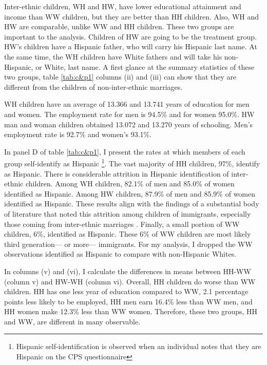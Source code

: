 \documentclass[12pt, fullpage]{article}
\begin{document}
Inter-ethnic children, WH and HW, have lower educational attainment and income than WW children, but they are better than HH children. Also, WH and HW are comparable, unlike WW and HH children. These two groups are important to the analysis. Children of HW are going to be the treatment group. HW's children have a Hispanic father, who will carry his Hispanic last name. At the same time, the WH children have White fathers and will take his non-Hispanic, or White, last name. A first glance at the summary statistics of these two groups, table \ref{tab:c&p1} columns (ii) and (iii) can show that they are different from the children of non-inter-ethnic marriages. 



\newpage




WH children have an average of 13.366 and 13.741 years of education for men and women. The employment rate for men is 94.5\% and for women 95.0\%. HW man and woman children obtained 13.072 and 13.270 years of schooling. Men's employment rate is 92.7\% and women's 93.1\%.

In panel D of table \ref{tab:c&p1}, I present the rates at which members of each group self-identify as Hispanic \footnote{Hispanic self-identification is observed when an individual notes that they are Hispanic on the CPS questionnaire}. The vast majority of HH children, 97\%, identify as Hispanic. There is considerable attrition in Hispanic identification of inter-ethnic children. Among WH children, 82.1\% of men and 85.0\% of women identified as Hispanic. Among HW children, 87.9\% of men and 85.9\% of women identified as Hispanic. These results align with the findings of a substantial body of literature that noted this attrition among children of immigrants, especially those coming from inter-ethnic marriages \citep{duncan2017complexity, duncan2018identifying, duncan2020new, antman2020ethnic}. Finally, a small portion of WW children, 6\%, identified as Hispanic. These 6\% of WW children are most likely third generation--- or more--- immigrants. For my analysis, I dropped the WW observations identified as Hispanic to compare with non-Hispanic Whites.

In columns (v) and (vi), I calculate the differences in means between HH-WW (column v) and HW-WH (column vi). Overall, HH children do worse than WW children. HH has one less year of education compared to WW, 2.1 percentage points less likely to be employed, HH men earn 16.4\% less than WW men, and HH women make 12.3\% less than WW women. Therefore, these two groups, HH and WW, are different in many observable.
\end{document}
